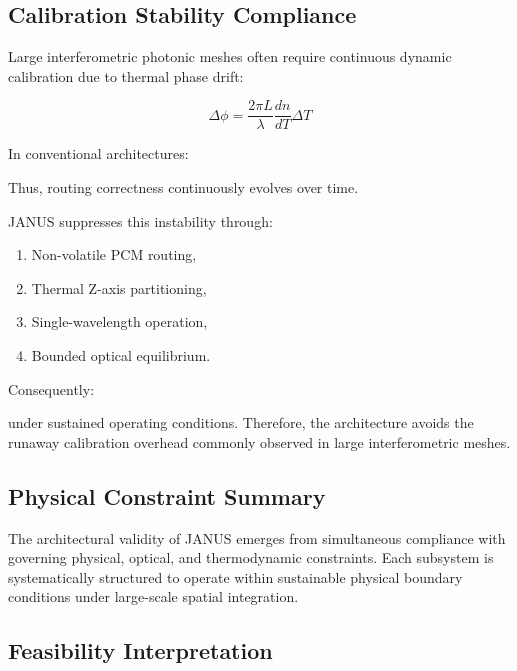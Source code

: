\documentclass[journal]{IEEEtran}
\begin{document}
\subsection{\textbf{Calibration Stability Compliance}}

Large interferometric photonic meshes often require continuous dynamic calibration due to thermal phase drift:

\begin{equation}
\Delta \phi = \frac{2\pi L}{\lambda} \frac{dn}{dT} \Delta T 
\end{equation}

In conventional architectures:

\begin{center}
\end{center}

Thus, routing correctness continuously evolves over time.

JANUS suppresses this instability through:
\begin{enumerate}
\item Non-volatile PCM routing,
\item Thermal Z-axis partitioning,
\item Single-wavelength operation,
\item Bounded optical equilibrium.
\end{enumerate}

Consequently:

\begin{center}
\end{center}

under sustained operating conditions. Therefore, the architecture avoids the runaway calibration overhead commonly observed in large interferometric meshes.

\subsection{\textbf{Physical Constraint Summary}}

The architectural validity of JANUS emerges from simultaneous compliance with governing physical, optical, and thermodynamic constraints. Each subsystem is systematically structured to operate within sustainable physical boundary conditions under large-scale spatial integration.

\subsection{\textbf{Feasibility Interpretation}}
\end{document}
